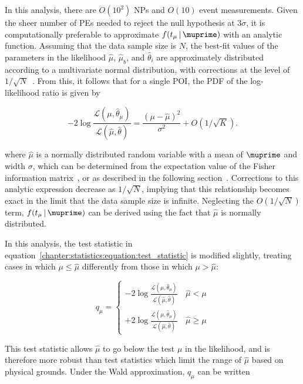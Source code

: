 In this analysis, there are $O(10^{2})$ NPs and $O(10)$ event
measurements. Given the sheer number of PEs needed to
reject the null hypothesis at $3\sigma$, it is
computationally preferable to approximate
$f(t_{\mu}\,|\,\muprime)$ with an analytic function. Assuming that the
data sample size is $N$, the best-fit values of the
parameters in the likelihood $\hat{\mu}$, $\hat{\mu}_b$, and $\hat{\theta}_i$ are
approximately distributed according to a multivariate normal
distribution, with corrections at the level of
$1/\sqrt{N}$~\cite{bib:wilks1938,bib:wald1943tests}. From this, it
follows that for a single POI, the PDF of the log-
likelihood ratio is given by

\begin{equation}
-2\log{\frac{\mathscr{L}(\mu,\hat{\theta}_{\mu})}{\mathscr{L}(\hat{\mu},\hat{\theta})}}
= \frac{\left(\mu-\hat{\mu}\right)^2}{\sigma^2} + O\left(1/\sqrt{K}\right).
\end{equation}

\noindent
where $\hat{\mu}$ is a normally distributed random
variable with a mean of $\muprime$
and width $\sigma$, which can be determined from the expectation value
of the Fisher information matrix~\cite{bib:Reinert}, or as described in the
following section~\cite{bib:Cowan:2010js}. Corrections to
this analytic expression decrease as $1/\sqrt{N}$, implying that this
relationship becomes exact in the limit that the data sample size is
infinite. Neglecting the $O(1/\sqrt{N})$ term,
$f(t_{\mu}\,|\,\muprime)$ can be derived using the fact that
$\hat{\mu}$ is normally distributed.

In this analysis, the test statistic in
equation~\ref{chapter:statistics:equation:test_statistic} is modified
slightly, treating cases in which $\mu \leq \hat{\mu}$ differently
from those in which $\mu > \hat{\mu}$:

\begin{equation}
q_{\mu} = \left\{
\begin{array}{ll}
-2\log{\frac{\mathscr{L}\left(\mu,\hat{\theta}_{\mu}\right)}{\mathscr{L}\left(\hat{\mu},\hat{\theta}\right)}}
& \, \hat{\mu} < \mu \\
+2\log{\frac{\mathscr{L}\left(\mu,\hat{\theta}_{\mu}\right)}{\mathscr{L}\left(\hat{\mu},\hat{\theta}\right)}}
& \, \hat{\mu} \geq \mu
\end{array}
\right.
\label{chapter:statistics:equation:test_statistic_runsig}
\end{equation}

\noindent
This test statistic allows $\hat{\mu}$ to go below the test $\mu$ in the
likelihood, and is therefore more robust than test statistics which
limit the range of $\hat{\mu}$ based on physical grounds. Under the Wald
approximation, $q_{\mu}$ can be written

